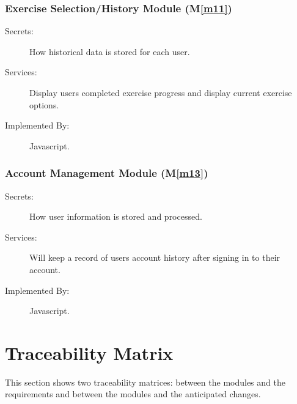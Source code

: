 \documentclass[12pt, titlepage]{article}
\newcommand{\mref}[1]{M\ref{#1}}
\begin{document}
\subsubsection{Exercise Selection/History Module (\mref{m11})}
\begin{description}
\item[Secrets:] How historical data is stored for each user.
\item[Services:] Display users completed exercise progress and display current exercise options.
\item[Implemented By:] Javascript.
\end{description}

\subsubsection{Account Management Module (\mref{m13})}
\begin{description}
\item[Secrets:] How user information is stored and processed.
\item[Services:] Will keep a record of users account history after signing in to their account.
\item[Implemented By:] Javascript.
\end{description}

\section{Traceability Matrix} \label{SecTM}

This section shows two traceability matrices: between the modules and the
requirements and between the modules and the anticipated changes.
\end{document}
